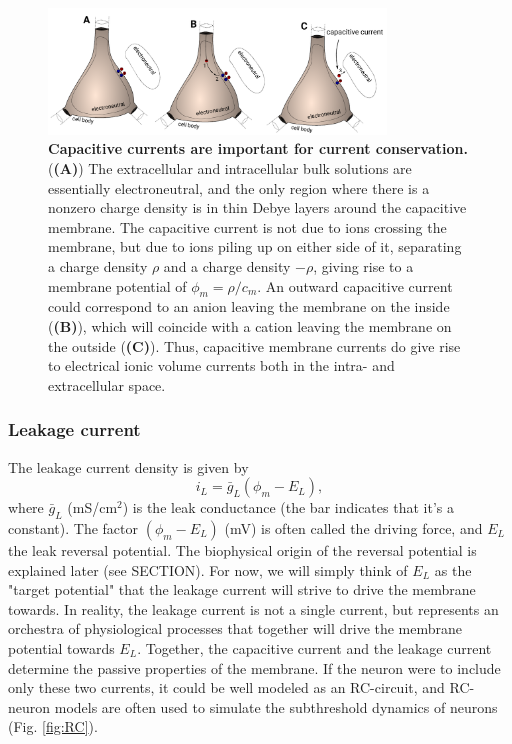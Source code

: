 \begin{figure}[!ht]
\begin{center}
\includegraphics[width=0.8\textwidth]{Fig02/capacitive_currents.pdf}
\end{center}
\caption{\textbf{Capacitive currents are important for current conservation.}  (\textbf{(A)}) The extracellular and intracellular bulk solutions are essentially electroneutral, and the only region where there is a nonzero charge density is in thin Debye layers around the capacitive membrane. The capacitive current is not due to ions crossing the membrane, but due to ions piling up on either side of it, separating a charge density $\rho$ and a charge density $-\rho$, giving rise to a membrane potential of $\phi_m = \rho/c_m$. An outward capacitive current could correspond to an anion leaving the membrane on the inside (\textbf{(B)}), which will coincide with a cation leaving the membrane on the outside (\textbf{(C)}). Thus, capacitive membrane currents do give rise to electrical ionic volume currents both in the intra- and extracellular space.
}
\label{fig:capacitive_currents}
\end{figure}


\subsubsection{Leakage current}
The leakage current density is given by
\begin{equation}
i_L = \bar{g}_L (\phi_m - E_L),
\label{eq:HHleak}
\end{equation}
where $\bar{g}_L$ (mS/cm$^2$) is the leak conductance (the bar indicates that it's a constant). The factor $(\phi_m - E_L)$ (mV) is often called the driving force, and $E_L$ the leak reversal potential. The biophysical origin of the reversal potential is explained later (see SECTION). For now, we will simply think of $E_L$ as the "target potential" that the leakage current will strive to drive the membrane towards. In reality, the leakage current is not a single current, but represents an orchestra of physiological processes that together will drive the membrane potential towards $E_L$. Together, the capacitive current and the leakage current determine the passive properties of the membrane. If the neuron were to include only these two currents, it could be well modeled as an RC-circuit, and RC-neuron models are often used to simulate the subthreshold dynamics of neurons (Fig. \ref{fig:RC}). 

